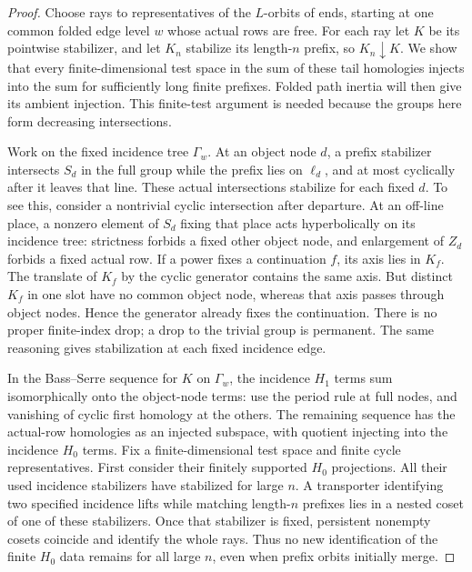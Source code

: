 \begin{proof}
Choose rays to representatives of the $L$-orbits of ends, starting at
one common folded edge level $w$ whose actual rows are free. For
each ray let $K$ be its pointwise stabilizer, and let $K_n$ stabilize
its length-$n$ prefix, so $K_n\downarrow K$. We show that every
finite-dimensional test space in the sum of these tail homologies
injects into the sum for sufficiently long finite prefixes. Folded
path inertia will then give its ambient injection. This finite-test
argument is needed because the groups here form decreasing
intersections.

Work on the fixed incidence tree $\Gamma_w$. At an object node $d$,
a prefix stabilizer intersects $S_d$ in the full group while the
prefix lies on $\ell_d$, and at most cyclically after it leaves that
line. These actual intersections stabilize for each fixed $d$.
To see this, consider a nontrivial cyclic intersection after departure.
At an off-line place, a nonzero element of $S_d$ fixing that place
acts hyperbolically on its incidence tree: strictness forbids a fixed
other object node, and enlargement of $Z_d$ forbids a fixed actual
row. If a power fixes a continuation $f$, its axis lies in $K_f$.
The translate of $K_f$ by the cyclic generator contains the same axis.
But distinct $K_f$ in one slot have no common object node, whereas
that axis passes through object nodes. Hence the generator already
fixes the continuation. There is no proper finite-index drop; a drop
to the trivial group is permanent. The same reasoning gives
stabilization at each fixed incidence edge.

In the Bass--Serre sequence for $K$ on $\Gamma_w$, the incidence
$H_1$ terms sum isomorphically onto the object-node terms: use the
period rule at full nodes, and vanishing of cyclic first homology at
the others. The remaining sequence has the actual-row homologies as
an injected subspace, with quotient injecting into the incidence
$H_0$ terms. Fix a finite-dimensional test space and finite cycle
representatives. First consider their finitely supported $H_0$
projections. All their used incidence stabilizers have stabilized
for large $n$. A transporter identifying two specified incidence
lifts while matching length-$n$ prefixes lies in a nested coset of
one of these stabilizers. Once that stabilizer is fixed, persistent
nonempty cosets coincide and identify the whole rays. Thus no new
identification of the finite $H_0$ data remains for all large $n$,
even when prefix orbits initially merge.


\end{proof}
